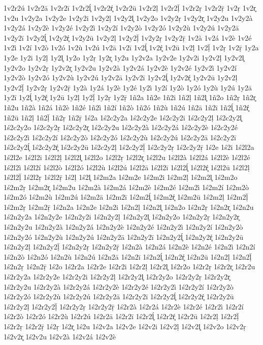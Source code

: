 {1v2r2ú
1v2r2ā
1v2r2ī
1v2r2ĺ̥
1v2r2ŕ̥
1v2r2ū
1v2r2ḷ
1v2r2ḹ
1v2r2ṛ
1v2r2ṝ
1v2ṛ
1v2r̥
1v2u
1v2y2a
1v2y2e
1v2y2i
1v2y2ḷ
1v2y2l̥
1v2y2o
1v2y2ṛ
1v2y2r̥
1v2y2u
1v2y2à
1v2y2á
1v2y2è
1v2y2é
1v2y2ì
1v2y2í
1v2y2ò
1v2y2ó
1v2y2ù
1v2y2ú
1v2y2ā
1v2y2ī
1v2y2ĺ̥
1v2y2ŕ̥
1v2y2ū
1v2y2ḷ
1v2y2ḹ
1v2y2ṛ
1v2y2ṝ
1v2à
1v2á
1v2è
1v2é
1v2ì
1v2í
1v2ò
1v2ó
1v2ù
1v2ú
1v2ā
1v2ī
1v2ĺ̥
1v2ŕ̥
1v2ū
1v2ḷ
1v2ḹ
1v2ṛ
1v2ṝ
1y2a
1y2e
1y2i
1y2ḷ
1y2l̥
1y2o
1y2ṛ
1y2r̥
1y2u
1y2v2a
1y2v2e
1y2v2i
1y2v2ḷ
1y2v2l̥
1y2v2o
1y2v2ṛ
1y2v2r̥
1y2v2u
1y2v2à
1y2v2á
1y2v2è
1y2v2é
1y2v2ì
1y2v2í
1y2v2ò
1y2v2ó
1y2v2ù
1y2v2ú
1y2v2ā
1y2v2ī
1y2v2ĺ̥
1y2v2ŕ̥
1y2v2ū
1y2v2ḷ
1y2v2ḹ
1y2v2ṛ
1y2v2ṝ
1y2à
1y2á
1y2è
1y2é
1y2ì
1y2í
1y2ò
1y2ó
1y2ù
1y2ú
1y2ā
1y2ī
1y2ĺ̥
1y2ŕ̥
1y2ū
1y2ḷ
1y2ḹ
1y2ṛ
1y2ṝ
1ñ2a
1ñ2e
1ñ2i
1ñ2ḷ
1ñ2l̥
1ñ2o
1ñ2ṛ
1ñ2r̥
1ñ2u
1ñ2à
1ñ2á
1ñ2è
1ñ2é
1ñ2ì
1ñ2í
1ñ2ò
1ñ2ó
1ñ2ù
1ñ2ú
1ñ2ā
1ñ2ī
1ñ2ĺ̥
1ñ2ŕ̥
1ñ2ū
1ñ2ḷ
1ñ2ḹ
1ñ2ṛ
1ñ2ṝ
1ś2a
1ś2c2y2a
1ś2c2y2e
1ś2c2y2i
1ś2c2y2ḷ
1ś2c2y2l̥
1ś2c2y2o
1ś2c2y2ṛ
1ś2c2y2r̥
1ś2c2y2u
1ś2c2y2à
1ś2c2y2á
1ś2c2y2è
1ś2c2y2é
1ś2c2y2ì
1ś2c2y2í
1ś2c2y2ò
1ś2c2y2ó
1ś2c2y2ù
1ś2c2y2ú
1ś2c2y2ā
1ś2c2y2ī
1ś2c2y2ĺ̥
1ś2c2y2ŕ̥
1ś2c2y2ū
1ś2c2y2ḷ
1ś2c2y2ḹ
1ś2c2y2ṛ
1ś2c2y2ṝ
1ś2e
1ś2i
1ś2l2a
1ś2l2e
1ś2l2i
1ś2l2ḷ
1ś2l2l̥
1ś2l2o
1ś2l2ṛ
1ś2l2r̥
1ś2l2u
1ś2l2à
1ś2l2á
1ś2l2è
1ś2l2é
1ś2l2ì
1ś2l2í
1ś2l2ò
1ś2l2ó
1ś2l2ù
1ś2l2ú
1ś2l2ā
1ś2l2ī
1ś2l2ĺ̥
1ś2l2ŕ̥
1ś2l2ū
1ś2l2ḷ
1ś2l2ḹ
1ś2l2ṛ
1ś2l2ṝ
1ś2ḷ
1ś2l̥
1ś2m2a
1ś2m2e
1ś2m2i
1ś2m2ḷ
1ś2m2l̥
1ś2m2o
1ś2m2ṛ
1ś2m2r̥
1ś2m2u
1ś2m2à
1ś2m2á
1ś2m2è
1ś2m2é
1ś2m2ì
1ś2m2í
1ś2m2ò
1ś2m2ó
1ś2m2ù
1ś2m2ú
1ś2m2ā
1ś2m2ī
1ś2m2ĺ̥
1ś2m2ŕ̥
1ś2m2ū
1ś2m2ḷ
1ś2m2ḹ
1ś2m2ṛ
1ś2m2ṝ
1ś2n2a
1ś2n2e
1ś2n2i
1ś2n2ḷ
1ś2n2l̥
1ś2n2o
1ś2n2ṛ
1ś2n2r̥
1ś2n2u
1ś2n2y2a
1ś2n2y2e
1ś2n2y2i
1ś2n2y2ḷ
1ś2n2y2l̥
1ś2n2y2o
1ś2n2y2ṛ
1ś2n2y2r̥
1ś2n2y2u
1ś2n2y2à
1ś2n2y2á
1ś2n2y2è
1ś2n2y2é
1ś2n2y2ì
1ś2n2y2í
1ś2n2y2ò
1ś2n2y2ó
1ś2n2y2ù
1ś2n2y2ú
1ś2n2y2ā
1ś2n2y2ī
1ś2n2y2ĺ̥
1ś2n2y2ŕ̥
1ś2n2y2ū
1ś2n2y2ḷ
1ś2n2y2ḹ
1ś2n2y2ṛ
1ś2n2y2ṝ
1ś2n2à
1ś2n2á
1ś2n2è
1ś2n2é
1ś2n2ì
1ś2n2í
1ś2n2ò
1ś2n2ó
1ś2n2ù
1ś2n2ú
1ś2n2ā
1ś2n2ī
1ś2n2ĺ̥
1ś2n2ŕ̥
1ś2n2ū
1ś2n2ḷ
1ś2n2ḹ
1ś2n2ṛ
1ś2n2ṝ
1ś2o
1ś2r2a
1ś2r2e
1ś2r2i
1ś2r2ḷ
1ś2r2l̥
1ś2r2o
1ś2r2ṛ
1ś2r2r̥
1ś2r2u
1ś2r2y2a
1ś2r2y2e
1ś2r2y2i
1ś2r2y2ḷ
1ś2r2y2l̥
1ś2r2y2o
1ś2r2y2ṛ
1ś2r2y2r̥
1ś2r2y2u
1ś2r2y2à
1ś2r2y2á
1ś2r2y2è
1ś2r2y2é
1ś2r2y2ì
1ś2r2y2í
1ś2r2y2ò
1ś2r2y2ó
1ś2r2y2ù
1ś2r2y2ú
1ś2r2y2ā
1ś2r2y2ī
1ś2r2y2ĺ̥
1ś2r2y2ŕ̥
1ś2r2y2ū
1ś2r2y2ḷ
1ś2r2y2ḹ
1ś2r2y2ṛ
1ś2r2y2ṝ
1ś2r2à
1ś2r2á
1ś2r2è
1ś2r2é
1ś2r2ì
1ś2r2í
1ś2r2ò
1ś2r2ó
1ś2r2ù
1ś2r2ú
1ś2r2ā
1ś2r2ī
1ś2r2ĺ̥
1ś2r2ŕ̥
1ś2r2ū
1ś2r2ḷ
1ś2r2ḹ
1ś2r2ṛ
1ś2r2ṝ
1ś2ṛ
1ś2r̥
1ś2u
1ś2v2a
1ś2v2e
1ś2v2i
1ś2v2ḷ
1ś2v2l̥
1ś2v2o
1ś2v2ṛ
1ś2v2r̥
1ś2v2u
1ś2v2à
1ś2v2á
1ś2v2è
}
